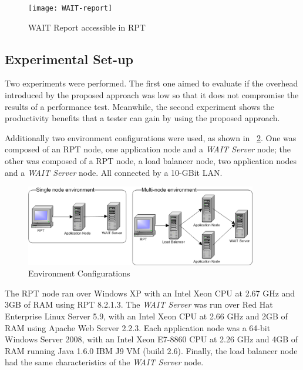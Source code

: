 \documentclass[runningheads,a4paper]{llncs}
\begin{document}

\begin{figure}[!h]
\centering
\texttt{[image: WAIT-report]}
\caption{WAIT Report accessible in RPT}
\label{fig_report}
\end{figure}

\vspace{-7pt}
\subsection{Experimental Set-up}
\vspace{-7pt}
Two experiments were performed. The first one aimed to evaluate if the overhead
introduced by the proposed approach was low so that it does not compromise the
results of a performance test. Meanwhile, the second experiment shows the
productivity benefits that a tester can gain by using the proposed approach.

Additionally two environment configurations were used, as shown in
\figurename ~\ref{fig_env}. One was composed of an RPT node, one application
node and a \emph{WAIT Server} node; the other was composed of a RPT node, a load
balancer node, two application nodes and a \emph{WAIT Server} node. All
connected by a 10-GBit LAN.

\begin{figure}[!h]
\centering
\includegraphics[totalheight=.15\textheight,width=0.9\textwidth]{Environments}
\caption{Environment Configurations}
\label{fig_env}
\end{figure}

The RPT node ran over Windows XP with an Intel Xeon CPU at
2.67 GHz and 3GB of RAM using RPT 8.2.1.3. The \emph{WAIT Server} was run over
Red Hat Enterprise Linux Server 5.9, with an Intel Xeon CPU at 2.66 GHz and 2GB of
RAM using Apache Web Server 2.2.3. Each application node was a 64-bit Windows
Server 2008, with an Intel Xeon E7-8860 CPU at 2.26 GHz and 4GB of RAM
running Java 1.6.0 IBM J9 VM (build 2.6). Finally, the load balancer node had
the same characteristics of the \emph{WAIT Server} node. 
\end{document}
